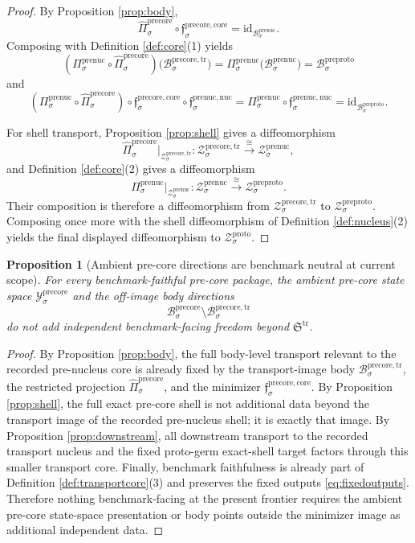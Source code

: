 \documentclass[11pt]{article}
\newcommand{\ProtoShellSet}[1]{\mathcal Z_{#1}^{\mathrm{proto}}}
\newcommand{\PreProtoBody}[1]{\mathcal B_{#1}^{\mathrm{preproto}}}
\newcommand{\PreProtoShellSet}[1]{\mathcal Z_{#1}^{\mathrm{preproto}}}
\newcommand{\PreNucBody}[1]{\mathcal B_{#1}^{\mathrm{prenuc}}}
\newcommand{\PreNucProj}[1]{\Pi_{#1}^{\mathrm{prenuc}}}
\newcommand{\PreNucNucleusMin}[1]{\mathfrak f_{#1}^{\mathrm{prenuc,nuc}}}
\newcommand{\PreNucShellSet}[1]{\mathcal Z_{#1}^{\mathrm{prenuc}}}
\newcommand{\PreCoreTransportCore}{\mathfrak S^{\mathrm{tr}}}
\newcommand{\PreCoreSpace}[1]{\mathcal Y_{#1}^{\mathrm{precore}}}
\newcommand{\PreCoreBody}[1]{\mathcal B_{#1}^{\mathrm{precore}}}
\newcommand{\PreCoreCoreMin}[1]{\mathfrak f_{#1}^{\mathrm{precore,core}}}
\newcommand{\PreCoreTrBody}[1]{\mathcal B_{#1}^{\mathrm{precore,tr}}}
\newcommand{\PreCoreTrProj}[1]{\widehat{\Pi}_{#1}^{\mathrm{precore}}}
\newcommand{\PreCoreTrShell}[1]{\mathcal Z_{#1}^{\mathrm{precore,tr}}}
\newtheorem{proposition}{Proposition}
\begin{document}
\begin{proof}
By Proposition \ref{prop:body},
\[
\PreCoreTrProj{\sigma}\circ\PreCoreCoreMin{\sigma}
=
\mathrm{id}_{\PreNucBody{\sigma}}.
\]
Composing with Definition \ref{def:core}(1) yields
\[
(\PreNucProj{\sigma}\circ\PreCoreTrProj{\sigma})\bigl(\PreCoreTrBody{\sigma}\bigr)
=
\PreNucProj{\sigma}\bigl(\PreNucBody{\sigma}\bigr)
=
\PreProtoBody{\sigma}
\]
and
\[
(\PreNucProj{\sigma}\circ\PreCoreTrProj{\sigma})\circ
\PreCoreCoreMin{\sigma}\circ\PreNucNucleusMin{\sigma}
=
\PreNucProj{\sigma}\circ\PreNucNucleusMin{\sigma}
=
\mathrm{id}_{\PreProtoBody{\sigma}}.
\]

For shell transport, Proposition \ref{prop:shell} gives a diffeomorphism
\[
\PreCoreTrProj{\sigma}\big|_{\PreCoreTrShell{\sigma}}
:
\PreCoreTrShell{\sigma}\xrightarrow{\cong}\PreNucShellSet{\sigma},
\]
and Definition \ref{def:core}(2) gives a diffeomorphism
\[
\PreNucProj{\sigma}\big|_{\PreNucShellSet{\sigma}}
:
\PreNucShellSet{\sigma}\xrightarrow{\cong}\PreProtoShellSet{\sigma}.
\]
Their composition is therefore a diffeomorphism from \(\PreCoreTrShell{\sigma}\) to \(\PreProtoShellSet{\sigma}\). Composing once more with the shell diffeomorphism of Definition \ref{def:nucleus}(2) yields the final displayed diffeomorphism to \(\ProtoShellSet{\sigma}\).
\end{proof}

\begin{proposition}[Ambient pre-core directions are benchmark neutral at current scope]
\label{prop:neutral}
For every benchmark-faithful pre-core package, the ambient pre-core state space \(\PreCoreSpace{\sigma}\) and the off-image body directions
\[
\PreCoreBody{\sigma}\setminus\PreCoreTrBody{\sigma}
\]
do not add independent benchmark-facing freedom beyond \(\PreCoreTransportCore\).
\end{proposition}

\begin{proof}
By Proposition \ref{prop:body}, the full body-level transport relevant to the recorded pre-nucleus core is already fixed by the transport-image body \(\PreCoreTrBody{\sigma}\), the restricted projection \(\PreCoreTrProj{\sigma}\), and the minimizer \(\PreCoreCoreMin{\sigma}\). By Proposition \ref{prop:shell}, the full exact pre-core shell is not additional data beyond the transport image of the recorded pre-nucleus shell; it is exactly that image. By Proposition \ref{prop:downstream}, all downstream transport to the recorded transport nucleus and the fixed proto-germ exact-shell target factors through this smaller transport core. Finally, benchmark faithfulness is already part of Definition \ref{def:transportcore}(3) and preserves the fixed outputs \eqref{eq:fixedoutputs}. Therefore nothing benchmark-facing at the present frontier requires the ambient pre-core state-space presentation or body points outside the minimizer image as additional independent data.
\end{proof}
\end{document}
